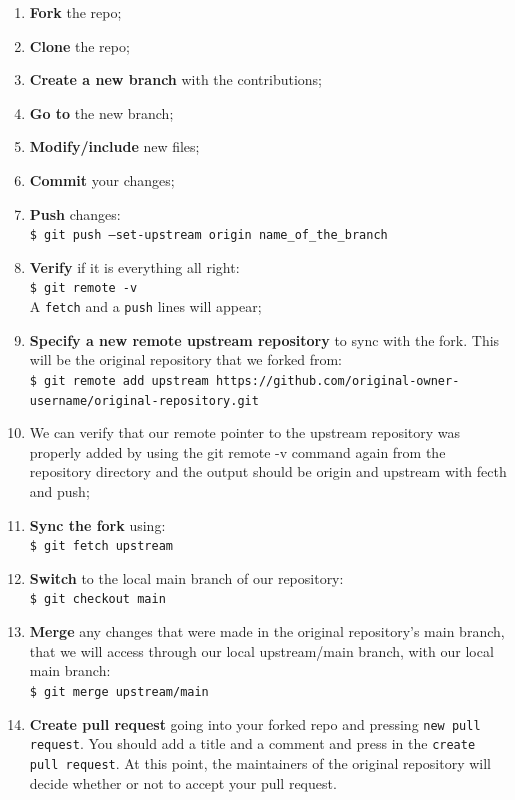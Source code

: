 \documentclass[12pt,a4paper,titlepage,brazil]{article}
\begin{document}
{\begin{enumerate}
 \item {\bf Fork} the repo;
 \item {\bf Clone} the repo;
 \item {\bf Create a new branch} with the contributions;
 \item {\bf Go to} the new branch;
 \item {\bf Modify/include} new files;
 \item {\bf Commit} your changes;
 \item {\bf Push} changes:\\
   \texttt{\$ git push --set-upstream origin name\_of\_the\_branch}\\
 \item {\bf Verify} if it is everything all right:\\  
   \texttt{\$ git remote -v}\\
 A \texttt{fetch} and a \texttt{push} lines will appear;
 \item {\bf Specify a new remote upstream repository} to sync with the fork. This will be the original repository that we forked from:\\
   \texttt{\$ git remote add upstream https://github.com/original-owner-username/original-repository.git}\\
 \item We can verify that our remote pointer to the upstream repository was properly added by using the git remote -v command again from the repository directory and the output should be origin and upstream with fecth and push;
 \item {\bf Sync the fork} using:\\
   \texttt{\$ git fetch upstream}\\
 \item {\bf Switch} to the local main branch of our repository:\\
   \texttt{\$ git checkout main}\\
 \item {\bf Merge} any changes that were made in the original repository's main branch, that we will
   access through our local upstream/main branch, with our local main branch:\\
   \texttt{\$ git merge upstream/main}\\
 \item {\bf Create pull request} going into your forked repo and pressing \texttt{new pull request}. You should add a title and a comment and press in the \texttt{create pull request}. At this point, the maintainers of the original repository will decide whether or not to accept your pull request.  
\end{enumerate}

}
\end{document}
